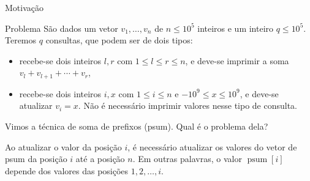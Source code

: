 \begin{frame}{Motivação}

    \begin{block}{Problema}
        São dados um vetor $v_1, \dots, v_n$ de $n \leq 10^5$ inteiros e um inteiro $q \leq 10^5$. Teremos $q$ consultas, que podem ser de dois tipos:
            \begin{itemize}
                \item[(i)] recebe-se dois inteiros $l, r$ com $1 \leq l \leq r \leq n$, e deve-se imprimir a soma $v_l + v_{l+1} + \cdots + v_r$,
                \item[(ii)]recebe-se dois inteiros $i, x$ com $1 \leq i \leq n$ e $-10^9 \leq x \leq 10^9$, e deve-se atualizar $v_i = x$. Não é necessário imprimir valores nesse tipo de consulta.
            \end{itemize}
    \end{block}

    Vimos a técnica de soma de prefixos (psum). Qual é o problema dela?

    Ao atualizar o valor da posição $i$, é necessário atualizar os valores do vetor de psum da posição $i$ até a posição $n$. Em outras palavras, o valor $\operatorname{psum}[i]$ depende dos valores das posições $1, 2, \dots, i$.
    

\end{frame}
